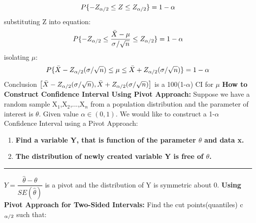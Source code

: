 \documentclass[]{article}
\begin{document}
\[  P \{ -Z_{\alpha\\/2} \le Z \le Z_{\alpha\\/2}  \}  = 1 - \alpha  \] 
\newline substituting Z into equation:
\[  P \{ -Z_{\alpha\\/2} \le \dfrac{\bar{X} - \mu}{\sigma \\/ \sqrt{n} }  \le Z_{\alpha\\/2}  \}  = 1 - \alpha  \] 
\newline isolating $\mu$:
\[  P \{ \bar{X}-Z_{\alpha\\/2} (\sigma \\/ \sqrt{n}) \le \mu \le \bar{X}+Z_{\alpha\\/2} (\sigma \\/ \sqrt{n})  \}   = 1 - \alpha  \] 
\newline Conclusion
$\left[\bar{X} - Z_{\alpha\\/2} (\sigma \\/ \sqrt{n}), \bar{X} + Z_{\alpha\\/2} (\sigma \\/ \sqrt{n}) \right] $ is a 100(1-$\alpha$) CI for $\mu$ 
\newline
\newline\textbf{How to Construct Confidence Interval Using Pivot Approach:} 
\newline Suppose we have a random sample X$_1$,X$_2$,...,X$_n$ from a population distribution and the parameter of interest is $\theta$.
\newline
\newline Given value $\alpha \in (0,1)$. We would like to construct a 1-$\alpha$ Confidence Interval using a Pivot Approach:
\begin{enumerate}
	\item\textbf{Find a variable Y, that is function of the parameter $\theta$ and data x.}
	\item\textbf{The distribution of newly created variable Y is free of $\theta$.}
\end{enumerate}
\newline\Large\rule{3.0cm}{0pt}$Y = \dfrac{\hat{\theta} - \theta}{ SE(\hat{\theta})}$ is a pivot and the distribution of Y is symmetric about 0.
\newline
\newline
\newline\Large\textbf{ Using Pivot Approach for Two-Sided Intervals:}
\newline Find the cut points(quantiles)  c$_{\alpha \\/ 2}$ such that:
\end{document}
